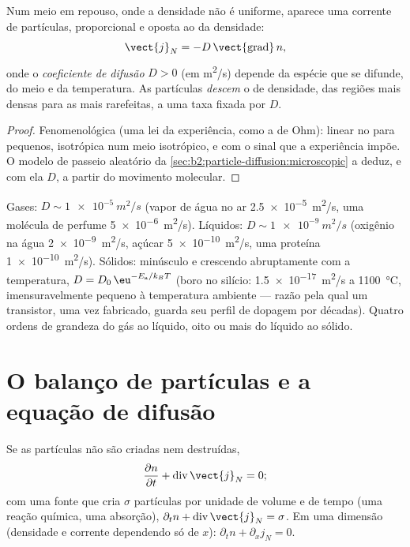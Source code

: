 \begin{theorem}\label{thm:b2:particle-diffusion:fick}
Num meio em repouso, onde a densidade não é uniforme, aparece uma
corrente de partículas, proporcional e oposta ao  da
densidade:
\[
\vect{j}_N = -D\,\vect{\operatorname{grad}}\,n ,
\]
onde o \emph{coeficiente de difusão}
$D > 0$ (em \unit{m^2/s}) depende da espécie que se difunde, do
meio e da temperatura. As partículas \emph{descem} o  de
densidade, das regiões mais densas para as mais rarefeitas, a uma taxa fixada por $D$.
\end{theorem}

\begin{proof}
Fenomenológica (uma lei da experiência, como a de Ohm): linear no
 para  pequenos, isotrópica num meio isotrópico, e
com o sinal que a experiência impõe. O modelo de passeio aleatório da
\cref{sec:b2:particle-diffusion:microscopic} a deduz, e com ela $D$,
a partir do movimento molecular.
\end{proof}

\begin{example}\label{ex:b2:particle-diffusion:orders}
Gases: $D \sim \qty{1e-5}{m^2/s}$ (vapor de água no ar
\qty{2.5e-5}{m^2/s}, uma molécula de perfume \qty{5e-6}{m^2/s}). Líquidos:
$D \sim \qty{1e-9}{m^2/s}$ (oxigênio na água \qty{2e-9}{m^2/s}, açúcar
\qty{5e-10}{m^2/s}, uma proteína \qty{1e-10}{m^2/s}). Sólidos: minúsculo e
crescendo abruptamente com a temperatura, $D = D_0\,\eu^{-E_{\text{a}}/k_BT}$
(boro no silício: \qty{1.5e-17}{m^2/s} a \qty{1100}{\celsius},
imensuravelmente pequeno à temperatura ambiente --- razão pela qual um transistor,
uma vez fabricado, guarda seu perfil de dopagem por décadas). Quatro ordens de
grandeza do gás ao líquido, oito ou mais do líquido ao sólido.
\end{example}

\section{O balanço de partículas e a equação de difusão}

\begin{theorem}\label{thm:b2:particle-diffusion:balance}
Se as partículas não são criadas nem destruídas,
\[
\frac{\partial n}{\partial t} + \operatorname{div}\vect{j}_N = 0 ;
\]
com uma fonte que cria $\sigma$ partículas por unidade de volume e de tempo
(uma reação química, uma absorção), $\partial_t n +
\operatorname{div}\vect{j}_N = \sigma$. Em uma dimensão (densidade e
corrente dependendo só de $x$): $\partial_t n + \partial_x j_N = 0$.
\end{theorem}

